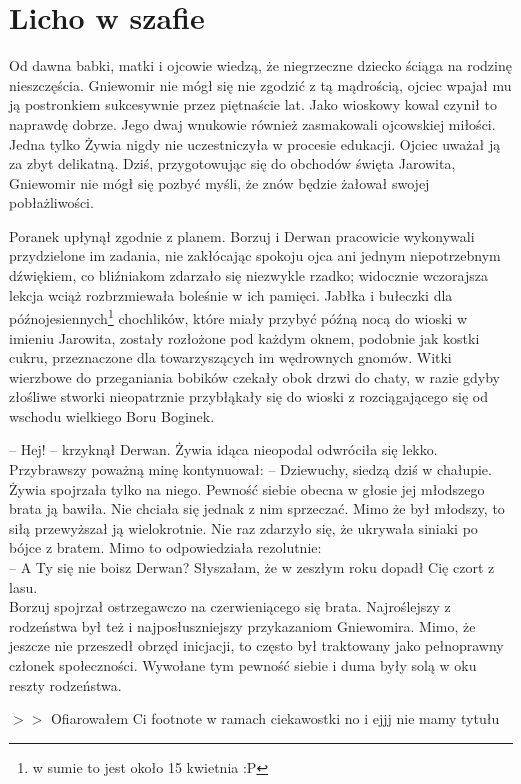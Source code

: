 \documentclass[12pt]{book}
\begin{document}
\chapter{Licho w szafie}
Od dawna babki, matki i ojcowie wiedzą, że niegrzeczne dziecko ściąga na rodzinę nieszczęścia. Gniewomir nie mógł się nie zgodzić z tą mądrością, ojciec wpajał mu ją postronkiem sukcesywnie przez piętnaście lat. Jako wioskowy kowal czynił to naprawdę dobrze. Jego dwaj wnukowie również zasmakowali ojcowskiej miłości. Jedna tylko Żywia nigdy nie uczestniczyła w procesie edukacji. Ojciec uważał ją za zbyt delikatną. Dziś, przygotowując się do obchodów święta Jarowita, Gniewomir nie mógł się pozbyć myśli, że znów będzie żałował swojej pobłażliwości. \par
Poranek upłynął zgodnie z planem. Borzuj i Derwan pracowicie wykonywali przydzielone im zadania, nie zakłócając spokoju ojca ani jednym niepotrzebnym dźwiękiem, co bliźniakom zdarzało się niezwykle rzadko; widocznie wczorajsza lekcja wciąż rozbrzmiewała boleśnie w ich pamięci. Jabłka i bułeczki dla późnojesiennych\footnote{w sumie to jest około 15 kwietnia :P} chochlików, które miały przybyć późną nocą do wioski w imieniu Jarowita, zostały rozłożone pod każdym oknem, podobnie jak kostki cukru, przeznaczone dla towarzyszących im wędrownych gnomów. Witki wierzbowe do przeganiania bobików czekały obok drzwi do chaty, w razie gdyby złośliwe stworki nieopatrznie przybłąkały się do wioski z rozciągającego się od wschodu wielkiego Boru Boginek. \par
-- Hej! -- krzyknął Derwan. Żywia idąca nieopodal odwróciła się lekko. Przybrawszy poważną minę kontynuował: -- Dziewuchy, siedzą dziś w chałupie.\\
Żywia spojrzała tylko na niego. Pewność siebie obecna w głosie jej młodszego brata ją bawiła. Nie chciała się jednak z nim sprzeczać. Mimo że był młodszy, to siłą przewyższał ją wielokrotnie. Nie raz zdarzyło się, że ukrywała siniaki po bójce z bratem. Mimo to odpowiedziała rezolutnie:\\
\indent -- A Ty się nie boisz Derwan? Słyszałam, że w zeszłym roku dopadł Cię czort z lasu. \\ 
Borzuj spojrzał ostrzegawczo na czerwieniącego się brata. Najroślejszy z rodzeństwa był też i najposłuszniejszy przykazaniom Gniewomira. Mimo, że jeszcze nie przeszedł obrzęd inicjacji, to często był traktowany jako pełnoprawny członek społeczności. Wywołane tym pewność siebie i duma były solą w oku reszty rodzeństwa.\par
$>>$
Ofiarowałem Ci footnote w ramach ciekawostki no i ejjj nie mamy tytułu
\end{document}
